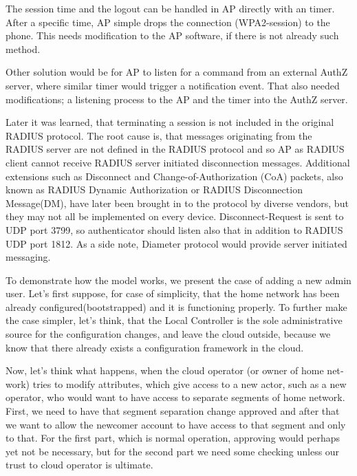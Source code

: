 \documentclass[12pt,a4paper,english]{tutthesis}
\begin{document}
\begin{otherlanguage}{english}
The session time and the logout can be handled in AP directly with
an timer. After a specific time, AP simple drops the connection
(WPA2-session) to the phone. This needs modification to the AP
software, if there is not already such method.

Other solution would be for AP to listen for a command from an external
AuthZ server, where similar timer would trigger a notification event. 
That also needed modifications;  a listening process to the AP and 
the timer into the AuthZ server. 




Later it was learned\cite{rfc2865}, that terminating a session is not
included in the original RADIUS protocol.  The root cause is, that
messages originating from the RADIUS server are not defined in the
RADIUS protocol and so AP as RADIUS client cannot receive RADIUS
server initiated disconnection messages.  Additional extensions such
as Disconnect and Change-of-Authorization (CoA) packets, also known as
RADIUS Dynamic Authorization or RADIUS Disconnection Message(DM)\cite{rfc5176}, have
later been brought in to the protocol by diverse
vendors, but they may not all be implemented on every device.
Disconnect-Request is sent to UDP port 3799, so authenticator should
listen also that in addition to RADIUS UDP port 1812.
As a side note, Diameter protocol would provide server initiated messaging.



To demonstrate how the model works, we present the case of adding a
new admin user. Let's first suppose, for case of simplicity, that the
home network has been already configured(bootstrapped) and it is
functioning properly.  To further make the case simpler, let's think,
that the Local Controller is the sole administrative source for the
configuration changes, and leave the cloud outside, 
because we know that there already exists a configuration framework in the cloud.


Now, let's think what happens, when the cloud operator (or owner of
home network) tries to modify attributes, which give access to a new actor,
such as a new operator, who would want to have access to separate
segments of home network.  First, we need to have that segment separation
change approved and after that we want to allow the newcomer account
to have access to that segment and only to that. For the first part,
which is normal operation, approving would perhaps yet not be
necessary, but for the second part we need some checking unless our
trust to cloud operator is ultimate.  


\end{otherlanguage}
\end{document}
